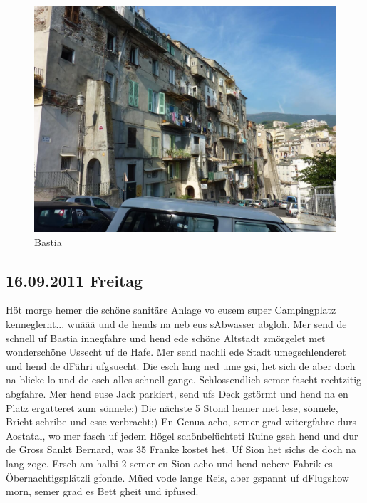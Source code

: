 \begin{figure}[H]
    \centering
    \includegraphics[width=\textwidth]{../Bilder/Korsika/53.jpg}
    \caption{Bastia}
    \label{img:Korsika3}
\end{figure}

\subsection{16.09.2011 Freitag}
Höt morge hemer die schöne sanitäre Anlage vo eusem super Campingplatz kenneglernt...
wuäää und de hends na neb eus sAbwasser abgloh.
Mer send de schnell uf Bastia innegfahre und hend ede schöne Altstadt zmörgelet met wonderschöne Ussecht uf de Hafe.
Mer send nachli ede Stadt umegschlenderet und hend de dFähri ufgsuecht.
Die esch lang ned ume gsi, het sich de aber doch na blicke lo und de esch alles schnell gange.
Schlossendlich semer fascht rechtzitig abgfahre.
Mer hend euse Jack parkiert, send ufs Deck gstörmt und hend na en Platz ergatteret zum sönnele:) Die nächste 5 Stond hemer met lese, sönnele, Bricht schribe und esse verbracht;) En Genua acho, semer grad witergfahre durs Aostatal, wo mer fasch uf jedem Högel schönbelüchteti Ruine gseh hend und dur de Gross Sankt Bernard, was 35 Franke kostet het.
Uf Sion het sichs de doch na lang zoge.
Ersch am halbi 2 semer en Sion acho und hend nebere Fabrik es Öbernachtigsplätzli gfonde.
Müed vode lange Reis, aber gspannt uf dFlugshow morn, semer grad es Bett gheit und ipfused.

